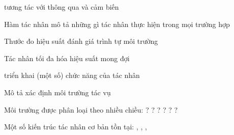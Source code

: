 \documentclass{article}
\begin{document}
\begin{huge}
\textwidth
{}



\textwidth
{}


\textwidth
{}



 tương tác với  thông qua
 và cảm biến 

Hàm tác nhân  mô tả những gì tác nhân thực hiện trong mọi trường hợp

Thước đo hiệu suất  đánh giá trình tự môi trường

Tác nhân  tối đa hóa hiệu suất mong đợi 

 triển khai (một số) chức năng của tác nhân

Mô tả  xác định môi trường tác vụ

Môi trường được phân loại theo nhiều chiều:\nl
  ? ? ? ? 
  ? ?

Một số kiến trúc tác nhân cơ bản tồn tại:\nl
  , , , 

\end{huge}
\end{document}
